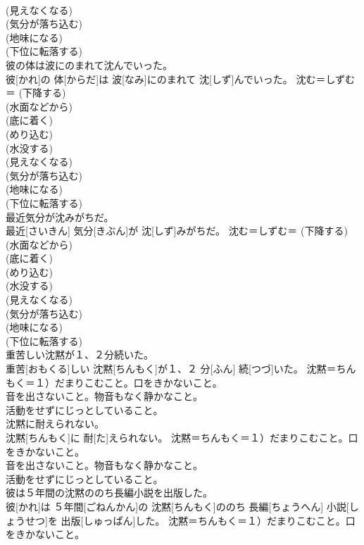 \documentclass[8pt]{extreport}
\begin{document}
\begin{CJK}{UTF8}{min}
{\\	(見えなくなる) 
\\	(気分が落ち込む) 
\\	(地味になる) 
\\	(下位に転落する) 
\\	彼の体は波にのまれて沈んでいった。	
\\	彼[かれ]の 体[からだ]は 波[なみ]にのまれて 沈[しず]んでいった。	沈む＝しずむ＝ (下降する) 
\\	(水面などから) 
\\	(底に着く) 
\\	(めり込む) 
\\	(水没する) 
\\	(見えなくなる) 
\\	(気分が落ち込む) 
\\	(地味になる) 
\\	(下位に転落する) 
\\	最近気分が沈みがちだ。	
\\	最近[さいきん] 気分[きぶん]が 沈[しず]みがちだ。	沈む＝しずむ＝ (下降する) 
\\	(水面などから) 
\\	(底に着く) 
\\	(めり込む) 
\\	(水没する) 
\\	(見えなくなる) 
\\	(気分が落ち込む) 
\\	(地味になる) 
\\	(下位に転落する) 
\\	重苦しい沈黙が１、２分続いた。	
\\	重苦[おもくる]しい 沈黙[ちんもく]が１、２ 分[ふん] 続[つづ]いた。	沈黙＝ちんもく＝１）だまりこむこと。口をきかないこと。 　　　　　　　　
\\	音を出さないこと。物音もなく静かなこと。 　　　　　　　　
\\	活動をせずにじっとしていること。
\\	沈黙に耐えられない。	
\\	沈黙[ちんもく]に 耐[た]えられない。	沈黙＝ちんもく＝１）だまりこむこと。口をきかないこと。 　　　　　　　　
\\	音を出さないこと。物音もなく静かなこと。 　　　　　　　　
\\	活動をせずにじっとしていること。
\\	彼は５年間の沈黙ののち長編小説を出版した。	
\\	彼[かれ]は ５年間[ごねんかん]の 沈黙[ちんもく]ののち 長編[ちょうへん] 小説[しょうせつ]を 出版[しゅっぱん]した。	沈黙＝ちんもく＝１）だまりこむこと。口をきかないこと。 　　　　　　　　
}
\end{CJK}
\end{document}
